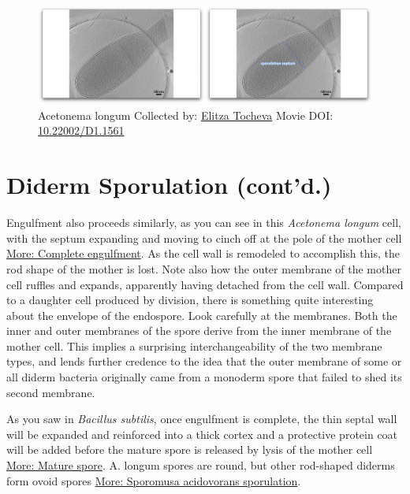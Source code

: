 \documentclass[]{tufte-book}
\begin{document}
\begin{figure}
\includegraphics{movie_stills/8_9} \caption[Acetonema longum Collected by:
\protect\hyperlink{elitza_tocheva}{Elitza Tocheva} Movie DOI:
\href{https://doi.org/10.22002/D1.1561}{10.22002/D1.1561}]{Acetonema longum Collected by:
\protect\hyperlink{elitza_tocheva}{Elitza Tocheva} Movie DOI:
\href{https://doi.org/10.22002/D1.1561}{10.22002/D1.1561}}\label{fig:8-9}
\end{figure}

\section{Diderm Sporulation (cont'd.)}\label{diderm-sporulation-contd.}

Engulfment also proceeds similarly, as you can see in this
\emph{Acetonema longum} cell, with the septum expanding and moving to
cinch off at the pole of the mother cell
\protect\hyperlink{Complete_engulfment}{More: Complete engulfment}. As
the cell wall is remodeled to accomplish this, the rod shape of the
mother is lost. Note also how the outer membrane of the mother cell
ruffles and expands, apparently having detached from the cell wall.
Compared to a daughter cell produced by division, there is something
quite interesting about the envelope of the endospore. Look carefully at
the membranes. Both the inner and outer membranes of the spore derive
from the inner membrane of the mother cell. This implies a surprising
interchangeability of the two membrane types, and lends further credence
to the idea that the outer membrane of some or all diderm bacteria
originally came from a monoderm spore that failed to shed its second
membrane.

As you saw in \emph{Bacillus subtilis}, once engulfment is complete, the
thin septal wall will be expanded and reinforced into a thick cortex and
a protective protein coat will be added before the mature spore is
released by lysis of the mother cell
\protect\hyperlink{Mature_spore}{More: Mature spore}. A. longum spores
are round, but other rod-shaped diderms form ovoid spores
\protect\hyperlink{Sporomusa_acidovorans_sporulation}{More: Sporomusa
acidovorans sporulation}.
\end{document}
